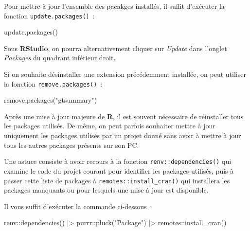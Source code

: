 \documentclass[
  letterpaper,
  DIV=11,
  numbers=noendperiod,
  oneside]{scrreprt}
\newenvironment{Shaded}{\begin{snugshade}}{\end{snugshade}}
\newcommand{\FunctionTok}[1]{\textcolor[rgb]{0.28,0.35,0.67}{#1}}
\newcommand{\NormalTok}[1]{\textcolor[rgb]{0.00,0.23,0.31}{#1}}
\newcommand{\SpecialCharTok}[1]{\textcolor[rgb]{0.37,0.37,0.37}{#1}}
\newcommand{\StringTok}[1]{\textcolor[rgb]{0.13,0.47,0.30}{#1}}
\begin{document}
Pour mettre à jour l'ensemble des pacakges installés, il suffit
d'exécuter la fonction \texttt{update.packages()}~:

\begin{Shaded}
\begin{Highlighting}[]
\FunctionTok{update.packages}\NormalTok{()}
\end{Highlighting}
\end{Shaded}

Sous \textbf{RStudio}, on pourra alternativement cliquer sur
\emph{Update} dans l'onglet \emph{Packages} du quadrant inférieur droit.

Si on souhaite désinstaller une extension précédemment installée, on
peut utiliser la fonction \texttt{remove.packages()}~:

\begin{Shaded}
\begin{Highlighting}[]
\FunctionTok{remove.packages}\NormalTok{(}\StringTok{"gtsummary"}\NormalTok{)}
\end{Highlighting}
\end{Shaded}

\begin{tcolorbox}[enhanced jigsaw, colbacktitle=quarto-callout-tip-color!10!white, opacityback=0, toprule=.15mm, colback=white, coltitle=black, bottomtitle=1mm, toptitle=1mm, titlerule=0mm, rightrule=.15mm, title=\textcolor{quarto-callout-tip-color}{\faLightbulb}\hspace{0.5em}{Installer / Mettre à jour les packages utilisés par un projet}, breakable, bottomrule=.15mm, opacitybacktitle=0.6, arc=.35mm, left=2mm, leftrule=.75mm, colframe=quarto-callout-tip-color-frame]

Après une mise à jour majeure de \textbf{R}, il est souvent nécessaire
de réinstaller tous les packages utilisés. De même, on peut parfois
souhaiter mettre à jour uniquement les packages utilisés par un projet
donné sans avoir à mettre à jour tous les autres packages présents sur
son PC.

Une astuce consiste à avoir recours à la fonction
\texttt{renv::dependencies()} qui examine le code du projet courant pour
identifier les packages utilisés, puis à passer cette liste de packages
à \texttt{remotes::install\_cran()} qui installera les packages
manquants ou pour lesquels une mise à jour est disponible.

Il vous suffit d'exécuter la commande ci-dessous~:

\begin{Shaded}
\begin{Highlighting}[]
\NormalTok{renv}\SpecialCharTok{::}\FunctionTok{dependencies}\NormalTok{() }\SpecialCharTok{|\textgreater{}} 
\NormalTok{  purrr}\SpecialCharTok{::}\FunctionTok{pluck}\NormalTok{(}\StringTok{"Package"}\NormalTok{) }\SpecialCharTok{|\textgreater{}} 
\NormalTok{  remotes}\SpecialCharTok{::}\FunctionTok{install\_cran}\NormalTok{()}
\end{Highlighting}
\end{Shaded}

\end{tcolorbox}
\end{document}
